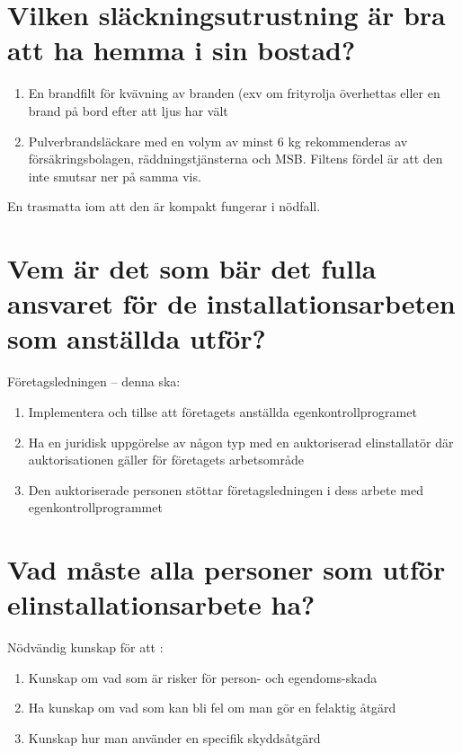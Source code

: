 \documentclass[a4paper,swedish]{article}
\begin{document}
\setcounter{section}{45}
\section{Vilken släckningsutrustning är bra att ha hemma i sin bostad?}\label{sec:slackutrustning}

\begin{enumerate}
\item En brandfilt för kvävning av branden (exv om frityrolja överhettas eller en brand på bord
  efter att ljus har vält
\item Pulverbrandsläckare med en volym av minst 6 kg rekommenderas av försäkringsbolagen, räddningstjänsterna och MSB. Filtens fördel är att den inte smutsar ner på samma vis.
\end{enumerate}

En trasmatta iom att den är kompakt fungerar i nödfall.

\setcounter{section}{47}
\section{Vem är det som bär det fulla ansvaret för de installationsarbeten som anställda utför?}\label{sec:ansvar_elarbeten}

Företagsledningen -- denna ska:
\begin{enumerate}
\item Implementera och tillse att företagets anställda egenkontrollprogramet
\item Ha en juridisk uppgörelse av någon typ med en auktoriserad elinstallatör där auktorisationen
  gäller för företagets arbetsområde
\item Den auktoriserade personen stöttar företagsledningen i dess arbete med egenkontrollprogrammet
\end{enumerate}

\setcounter{section}{49}
\section{Vad måste alla personer som utför elinstallationsarbete ha?}

Nödvändig kunskap för att :

\begin{enumerate}
\item Kunskap om vad som är risker för person- och egendoms-skada
\item Ha kunskap om vad som kan bli fel om man gör en felaktig åtgärd
\item Kunskap hur man använder en specifik skyddsåtgärd
\end{enumerate}
\end{document}
